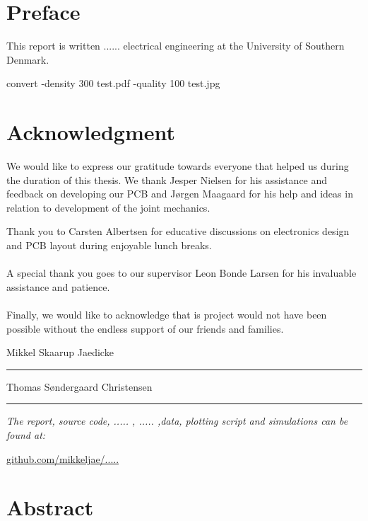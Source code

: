 
\section*{Preface}
This report is written ...... electrical engineering at the University of Southern Denmark.

convert -density 300 test.pdf -quality 100 test.jpg

\section*{Acknowledgment}

We would like to express our gratitude towards everyone that helped us during the duration of this thesis.
We thank Jesper Nielsen for his assistance and feedback on developing our PCB and Jørgen Maagaard for his help and ideas in relation to development of the joint mechanics. 

Thank you to Carsten Albertsen for educative discussions on electronics design and PCB layout during enjoyable lunch breaks. 
\\~\\
A special thank you goes to our supervisor Leon Bonde Larsen for his invaluable assistance and patience.
\\~\\
Finally, we would like to acknowledge that is project would not have been possible without the endless support of our friends and families.


\vspace{1cm}
\begin{center}
	\begin{minipage}[t]{.49\textwidth}\large
		\begin{center}
		Mikkel Skaarup Jaedicke\\
		\vspace{1cm}
		\hrule
		\vspace{0.5cm}
		Thomas Søndergaard Christensen
		\vspace{1cm}
		\hrule
		\end{center} 
	\end{minipage}
\end{center}

\vspace{1.2cm}
  \begin{center}
    \textsl{The report, source code, ..... , ..... ,data, plotting script and simulations can be found at:}  
    \end{center}
    \vspace{-5pt}
    \begin{center}
	\renewcommand{\UrlFont}{\color{black}\normalsize\tt}
    \url{github.com/mikkeljae/.....}
   \end{center}
\newpage

\section*{Abstract}
\lipsum[5]